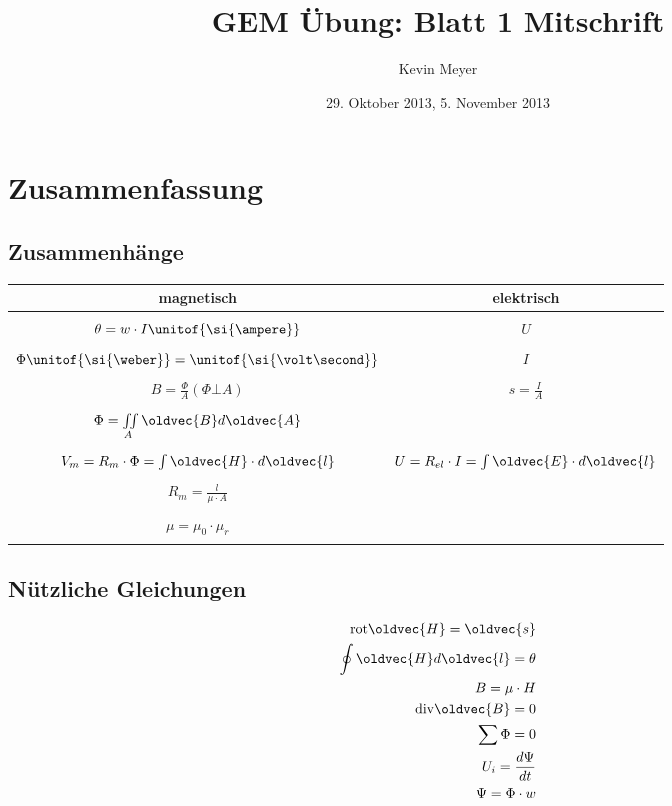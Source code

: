 \documentclass[10pt,a4paper]{article}
\let\vec = \oldvec
\begin{document}
\title{GEM Übung: \textbf{Blatt 1} Mitschrift}
\date{29. Oktober 2013, 5. November 2013}
\author{Kevin Meyer}
\maketitle

\section*{Zusammenfassung}
\subsection*{Zusammenhänge}

\begin{center}
\begin{tabular}{c|c}
\hline 
magnetisch & elektrisch \\ 
\hline \\
$\theta = w \cdot I \unitof{\si{\ampere}}$ & $U$ \\ \\
$\Phi \unitof{\si{\weber}}=\unitof{\si{\volt\second}} $& $I$\\ \\
$B = \frac{\Phi}{A} (\Phi \bot A)$ & $s = \frac{I}{A}$\\ \\
$\Phi = \iint\limits_A \vec{B} d \vec{A}$ &  \\ \\
$V_m = R_m \cdot\Phi = \int\vec{H} \cdot d \vec{l}$ & $U = R_{el} \cdot I= \int\vec{E} \cdot d \vec{l}$\\ \\
$R_m = \frac{l}{\mu\cdot A}$ & \\ \\
$\mu = \mu_0 \cdot \mu_r$ & \\ \\
\hline
\end{tabular} 
\end{center}

\subsection*{Nützliche Gleichungen}
\begin{align*}
\text{rot} \vec{H} = \vec{s}\\
\oint\vec{H} d \vec{l} = \theta\\
B = \mu\cdot H\\
\text{div}\vec{B}=0\\
\sum\Phi = 0\\
U_i = \frac{d\Psi}{dt}\\
\Psi = \Phi\cdot w
\end{align*}
\end{document}
